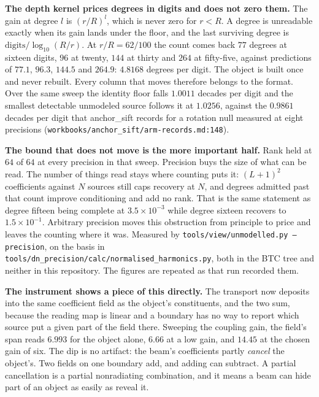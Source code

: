 \textbf{The depth kernel prices degrees in digits and does not zero them.} The gain at degree \(l\) is \((r/R)^l\), which is never zero for \(r < R\). A degree is unreadable exactly when its gain lands under the floor, and the last surviving degree is \(\text{digits} / \log_{10}(R/r)\). At \(r/R = 62/100\) the count comes back \(77\) degrees at sixteen digits, \(96\) at twenty, \(144\) at thirty and \(264\) at fifty-five, against predictions of \(77.1\), \(96.3\), \(144.5\) and \(264.9\): \(4.8168\) degrees per digit. The object is built once and never rebuilt. Every column that moves therefore belongs to the format. Over the same sweep the identity floor falls \(1.0011\) decades per digit and the smallest detectable unmodeled source follows it at \(1.0256\), against the \(0.9861\) decades per digit that anchor\_sift records for a rotation null measured at eight precisions (\texttt{workbooks/\allowbreak{}anchor\_sift/\allowbreak{}arm-records.md:148}).

\textbf{The bound that does not move is the more important half.} Rank held at \(64\) of \(64\) at every precision in that sweep. Precision buys the size of what can be read. The number of things read stays where counting puts it: \((L+1)^2\) coefficients against \(N\) sources still caps recovery at \(N\), and degrees admitted past that count improve conditioning and add no rank. That is the same statement as degree fifteen being complete at \(3.5 \times 10^{-3}\) while degree sixteen recovers to \(1.5 \times 10^{-1}\). Arbitrary precision moves this obstruction from principle to price and leaves the counting where it was. Measured by \texttt{tools/\allowbreak{}view/\allowbreak{}unmodelled.py --precision}, on the basis in \texttt{tools/dn\_precision/calc/normalised\_harmonics.py}, both in the BTC tree and neither in this repository. The figures are repeated as that run recorded them.

\textbf{The instrument shows a piece of this directly.} The transport now deposits into the same coefficient field as the object's constituents, and the two sum, because the reading map is linear and a boundary has no way to report which source put a given part of the field there. Sweeping the coupling gain, the field's span reads \(6.993\) for the object alone, \(6.66\) at a low gain, and \(14.45\) at the chosen gain of six. The dip is no artifact: the beam's coefficients partly \emph{cancel} the object's. Two fields on one boundary add, and adding can subtract. A partial cancellation is a partial nonradiating combination, and it means a beam can hide part of an object as easily as reveal it.

